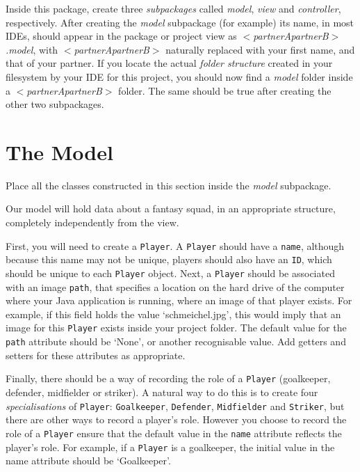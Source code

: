 \documentclass[11pt]{article}
\begin{document}
Inside this package, create three \emph{subpackages} called \emph{model}, \emph{view} and \emph{controller}, respectively. After creating the \emph{model} subpackage (for example) its name, in most IDEs, should appear in the package or project view as $<$\emph{partnerApartnerB}$>$\emph{.model}, with $<$\emph{partnerApartnerB}$>$ naturally replaced with your first name, and that of your partner. If you locate the actual \emph{folder structure} created in your filesystem by your IDE for this project, you should now find a \emph{model} folder inside a $<$\emph{partnerApartnerB}$>$ folder. The same should be true after creating the other two subpackages.

\section{The Model}
\label{sec:model}

Place all the classes constructed in this section inside the \emph{model} subpackage.

Our model will hold data about a fantasy squad, in an appropriate structure, completely independently from the view. 

First, you will need to create a \texttt{Player}. A \texttt{Player} should have a \texttt{name}, although because this name may not be unique, players should also have an \texttt{ID}, which should be unique to each \texttt{Player} object. Next, a \texttt{Player} should be associated with an image \texttt{path}, that specifies a location on the hard drive of the computer where your Java application is running, where an image of that player exists. For example, if this field holds the value `schmeichel.jpg', this would imply that an image for this \texttt{Player} exists inside your project folder. The default value for the \texttt{path} attribute should be `None', or another recognisable value. Add getters and setters for these attributes as appropriate.

Finally, there should be a way of recording the role of a \texttt{Player} (goalkeeper, defender, midfielder or striker). A natural way to do this is to create four \emph{specialisations} of \texttt{Player}: \texttt{Goalkeeper}, \texttt{Defender}, \texttt{Midfielder} and  \texttt{Striker}, but there are other ways to record a player's role. However you choose to record the role of a \texttt{Player} ensure that the default value in the \texttt{name} attribute reflects the player's role. For example, if a \texttt{Player} is a goalkeeper, the initial value in the name attribute should be `Goalkeeper'.
\end{document}
